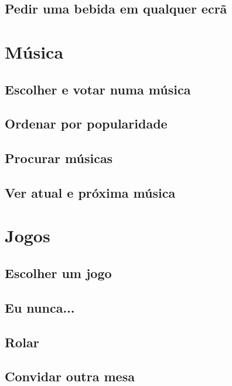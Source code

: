 \documentclass{article}
\begin{document}
\subsection{Pedir uma bebida em qualquer ecrã}
\section{Música}
\subsection{Escolher e votar numa música}
\subsection{Ordenar por popularidade}
\subsection{Procurar músicas}
\subsection{Ver atual e próxima música}
\section{Jogos}
\subsection{Escolher um jogo}
\subsection{Eu nunca...}
\subsection{Rolar}
\subsection{Convidar outra mesa}
\end{document}
